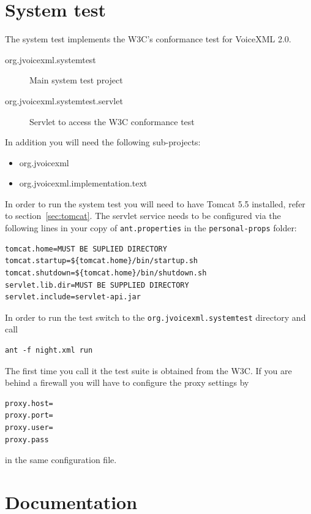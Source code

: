 \documentclass[11pt,a4paper]{article}
\begin{document}
\section{System test}

The system test implements the W3C's conformance test for VoiceXML 2.0.

\begin{description}
\item[org.jvoicexml.systemtest] Main system test project
\item[org.jvoicexml.systemtest.servlet] Servlet to access the W3C
confor\-man\-ce test
\end{description}

In addition you will need the following sub-projects:
\begin{itemize}
\item org.jvoicexml
\item org.jvoicexml.implementation.text
\end{itemize} 

In order to run the system test you will need to have Tomcat 5.5 installed,
refer to section~\ref{sec:tomcat}. The
servlet service needs to be configured via the following lines in your copy
of \texttt{ant.properties} in the \texttt{personal-props} folder:

\begin{lstlisting}
tomcat.home=MUST BE SUPLIED DIRECTORY
tomcat.startup=${tomcat.home}/bin/startup.sh
tomcat.shutdown=${tomcat.home}/bin/shutdown.sh
servlet.lib.dir=MUST BE SUPPLIED DIRECTORY
servlet.include=servlet-api.jar
\end{lstlisting}

In order to run the test switch to the \texttt{org.jvoicexml.systemtest}
directory and call
\begin{lstlisting}
ant -f night.xml run
\end{lstlisting}

The first time you call it the test suite is obtained from the W3C. If you are
behind a firewall you will have to configure the proxy settings by
\begin{lstlisting}
proxy.host=
proxy.port=
proxy.user=
proxy.pass
\end{lstlisting}
in the same configuration file.

\section{Documentation}
\end{document}
